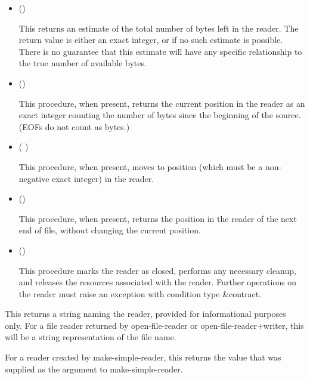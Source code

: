 \begin{entry}{%
}
\begin{itemize}
   may or may not be a bytes object returned by {\cf
    make-i/o-buffer}. It is possible that {\cf reader-read!} operates
  more efficiently if it is, however.
  
   may or may not be the same as the chunk size of the
  reader. It is possible that {\cf reader-read!} operates more
  efficiently if it is, however.

\item {\cf ()}
       
  This returns an estimate of the total number of bytes left in the
  reader. The return value is either an exact integer, or
  \schfalse{} if no such estimate is possible. There is no guarantee
  that this estimate will have any specific relationship to the true
  number of available bytes.

\item {\cf ()}
       
  This procedure, when present, returns the current position in the 
  reader as an exact integer counting the number of bytes since the
  beginning of the source. (EOFs do not count as bytes.)
  
\item {\cf ( )}
       
  This procedure, when present, moves to position  (which
  must be a non-negative exact integer) in the reader.
       
\item {\cf ()}
       
  This procedure, when present, returns the position in the reader
  of the next end of file, without changing the current position.

\item {\cf ()}
       
  This procedure marks the reader as closed, performs any necessary
  cleanup, and releases the resources associated with the reader.
  Further operations on the reader must raise an exception with
  condition type {\cf\&contract}.
\end{itemize}

\end{entry}

\begin{entry}{%
}
   
This returns a string naming the reader, provided for informational
purposes only. For a file reader returned by {\cf open-file-reader} or
{\cf open-file-reader+writer}, this will be a string representation of the file
name.
  
For a reader created by {\cf make-simple-reader}, this returns the value that was
supplied as the  argument to {\cf make-simple-reader}.
\end{entry}

